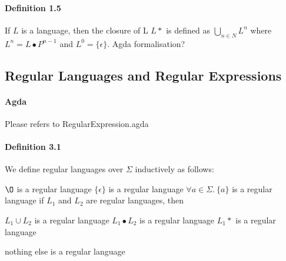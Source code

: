 \documentclass[twoside,openright,final]{bhamthesis}
\renewcommand{\item}{\itemindent0.5cm\itemold}
\begin{document}
\paragraph{Definition 1.5} If \(L\) is a language, then the closure of
L \(L\ast\) is defined as \( \bigcup_{n \in N} L^n \) where
\( L^n = L\bullet P^{n - 1} \) and \(L^0 = \{\epsilon\}\). Agda formalisation?

\subsection{Regular Languages and Regular Expressions}
\paragraph{Agda} Please refers to RegularExpression.agda

\paragraph{Definition 3.1} We define regular languages over
\(\Sigma\) inductively as follows:
\begin{enumerate}
  \item \(\O\) is a regular language
  \item \(\{\epsilon\}\) is a regular language
  \item \(\forall a\in\Sigma.\ \{a\}\) is a regular language
  \item if \(L_1\) and \(L_2\) are regular languages, then
    \begin{enumerate}
      \item \(L_1\cup L_2\) is a regular language
      \item \(L_1\bullet L_2\) is a regular language
      \item \(L_1\ast\) is a regular language
    \end{enumerate}
  \item nothing else is a regular language
\end{enumerate}
\end{document}

